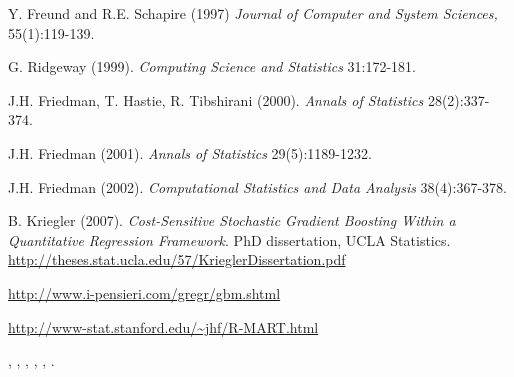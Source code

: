 \begin{References}\relax
Y. Freund and R.E. Schapire (1997)  \emph{Journal of Computer and
System Sciences,} 55(1):119-139.

G. Ridgeway (1999).  \emph{Computing Science and
Statistics} 31:172-181.

J.H. Friedman, T. Hastie, R. Tibshirani (2000).  \emph{Annals of Statistics} 28(2):337-374.

J.H. Friedman (2001).  \emph{Annals of Statistics} 29(5):1189-1232.

J.H. Friedman (2002).  \emph{Computational Statistics
and Data Analysis} 38(4):367-378.

B. Kriegler (2007). \emph{Cost-Sensitive Stochastic Gradient Boosting Within a 
Quantitative Regression Framework}. PhD dissertation, UCLA Statistics. 
\url{http://theses.stat.ucla.edu/57/KrieglerDissertation.pdf}

\url{http://www.i-pensieri.com/gregr/gbm.shtml}

\url{http://www-stat.stanford.edu/~jhf/R-MART.html}
\end{References}
\begin{SeeAlso}\relax
{},
,
,
,
,
.
\end{SeeAlso}
